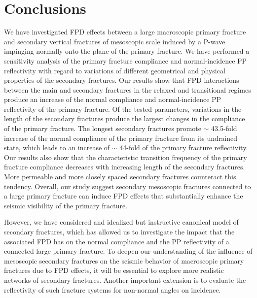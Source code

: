 \documentclass[draft]{agujournal2019}
\begin{document}
\section{Conclusions}
We have investigated FPD effects between a large macroscopic primary fracture and secondary vertical fractures of mesoscopic scale induced by a P-wave  impinging normally onto the plane of the primary fracture. We have performed a sensitivity analysis of the primary fracture compliance and normal-incidence PP reflectivity with regard to variations of different geometrical and physical properties of the secondary fractures. Our results show that FPD interactions between the main and secondary fractures in the relaxed and transitional regimes produce an increase of the normal compliance and normal-incidence PP reflectivity of the primary fracture. Of the tested parameters, variations in the length of the secondary fractures produce the largest changes in the compliance of the primary fracture. The longest secondary fractures promote  $\sim$  43.5-fold increase of the normal compliance of the primary fracture from its undrained state, which leads to an increase of $\sim$ 44-fold of the primary fracture reflectivity. Our results also show that the characteristic transition frequency of the primary fracture compliance decreases with increasing length of the secondary fractures. More permeable and  more closely spaced secondary fractures counteract this tendency.  
Overall, our study suggest secondary mesoscopic fractures connected to a large primary fracture can induce FPD effects that substantially  enhance the seismic visibility of the primary fracture. 

However, we have considered and idealized but instructive canonical model of secondary fractures, which has allowed us to investigate the impact that the associated FPD has on the normal compliance and the PP reflectivity of a connected large primary fracture. To deepen our understanding of the influence of mesoscopic secondary fractures on the seismic behavior of macroscopic primary fractures due to FPD effects, it will be essential to explore more realistic networks of secondary fractures. Another important extension is to evaluate the reflectivity of such fracture systems for non-normal angles on incidence.


\end{document}
